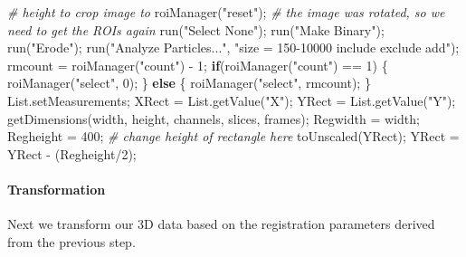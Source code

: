 \documentclass[10pt, b5paper, singlespacinge, twoside]{reedthesis} %
\newenvironment{Shaded}{}{}
\newcommand{\CommentTok}[1]{\textit{#1}}
\newcommand{\ControlFlowTok}[1]{\textbf{#1}}
\newcommand{\DecValTok}[1]{#1}
\newcommand{\FunctionTok}[1]{#1}
\newcommand{\NormalTok}[1]{#1}
\newcommand{\OtherTok}[1]{#1}
\newcommand{\SpecialCharTok}[1]{#1}
\newcommand{\StringTok}[1]{#1}
\theoremstyle{definition}
\theoremstyle{definition}
\theoremstyle{definition}
\theoremstyle{remark}
\begin{document}
\begin{Shaded}
\begin{Highlighting}[numbers=left,,]
\CommentTok{\# height to crop image to}
    \FunctionTok{roiManager}\NormalTok{(}\StringTok{"reset"}\NormalTok{); }\CommentTok{\# the image was rotated, so we need to get the ROIs again}
    \FunctionTok{run}\NormalTok{(}\StringTok{"Select None"}\NormalTok{);}
    \FunctionTok{run}\NormalTok{(}\StringTok{"Make Binary"}\NormalTok{);}
    \FunctionTok{run}\NormalTok{(}\StringTok{"Erode"}\NormalTok{);}
    \FunctionTok{run}\NormalTok{(}\StringTok{"Analyze Particles..."}\NormalTok{, }\StringTok{"size = 150{-}10000 include exclude add"}\NormalTok{);}
\NormalTok{    rmcount }\OtherTok{=} \FunctionTok{roiManager}\NormalTok{(}\StringTok{"count"}\NormalTok{) }\SpecialCharTok{{-}} \DecValTok{1}\NormalTok{;}
    \ControlFlowTok{if}\NormalTok{(}\FunctionTok{roiManager}\NormalTok{(}\StringTok{"count"}\NormalTok{) }\SpecialCharTok{==} \DecValTok{1}\NormalTok{) \{}
        \FunctionTok{roiManager}\NormalTok{(}\StringTok{"select"}\NormalTok{, }\DecValTok{0}\NormalTok{);}
\NormalTok{    \} }\ControlFlowTok{else}\NormalTok{ \{}
        \FunctionTok{roiManager}\NormalTok{(}\StringTok{"select"}\NormalTok{, rmcount);}
\NormalTok{    \}}
\NormalTok{    List.setMeasurements;}
\NormalTok{    XRect }\OtherTok{=} \FunctionTok{List.getValue}\NormalTok{(}\StringTok{"X"}\NormalTok{);}
\NormalTok{    YRect }\OtherTok{=} \FunctionTok{List.getValue}\NormalTok{(}\StringTok{"Y"}\NormalTok{);}
    \FunctionTok{getDimensions}\NormalTok{(width, height, channels, slices, frames);}
\NormalTok{    Regwidth }\OtherTok{=}\NormalTok{ width;}
\NormalTok{    Regheight }\OtherTok{=} \DecValTok{400}\NormalTok{; }\CommentTok{\# change height of rectangle here}
    \FunctionTok{toUnscaled}\NormalTok{(YRect);}
\NormalTok{    YRect }\OtherTok{=}\NormalTok{ YRect }\SpecialCharTok{{-}}\NormalTok{ (Regheight}\SpecialCharTok{/}\DecValTok{2}\NormalTok{);}
\end{Highlighting}
\end{Shaded}
\normalsize

\hypertarget{transformation}{%
\paragraph{Transformation}\label{transformation}}

Next we transform our 3D data based on the registration parameters derived from the previous step.
\end{document}
